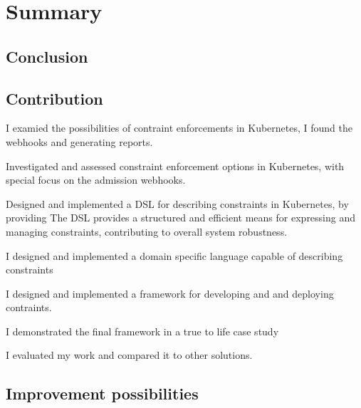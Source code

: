 \setlength{\parindent}{0pt}
\setlength{\parskip}{0.6em}

\chapter{Summary}
\label{chap:summary}

\section{Conclusion}

\section{Contribution}

I examied the possibilities of contraint enforcements in Kubernetes, I found the webhooks and generating reports.

Investigated and assessed constraint enforcement options in Kubernetes, with special focus on the admission webhooks.

Designed and implemented a DSL for describing constraints in Kubernetes, by providing
The DSL provides a structured and efficient means for expressing and managing constraints, contributing to overall system robustness.

I designed and implemented a domain specific language capable of describing constraints

I designed and implemented a framework for developing and and deploying contraints.

I demonstrated the final framework in a true to life case study

I evaluated my work and compared it to other solutions.

\section{Improvement possibilities}




